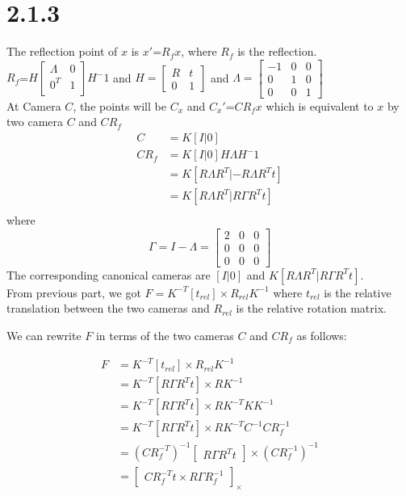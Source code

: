 \documentclass{article}
\begin{document}
\section*{2.1.3}
The reflection point of $x$ is $x'$=$R_fx$, where $R_f$ is the reflection.\\
$R_f$=$H\begin{bmatrix}
    \Lambda &0\\
    0^T &1\\
\end{bmatrix}H^-1$ and $H=\begin{bmatrix}
    R&t\\
    0&1
\end{bmatrix}$ and $\Lambda=\begin{bmatrix}
    -1&0&0\\
    0&1&0\\
    0&0&1
\end{bmatrix}$\\
At Camera $C$, the points will be $C_x$ and $C_x'$=$C R_f x$ which is equivalent to $x$ by two camera $C$ and $CR_f$\\
\begin{align*}
    C&=K[I|0]\\
    CR_f&=K[I|0]H\Lambda H^-1\\
    &=K[R\Lambda R^T|-R\Lambda R^Tt]\\
    &=K[R\Lambda R^T|R\Gamma R^Tt]\\
\end{align*}
where \begin{equation*}
    \Gamma=I-\Lambda=\begin{bmatrix}
        2&0&0\\
        0&0&0\\
        0&0&0
    \end{bmatrix}
\end{equation*}
The corresponding canonical cameras are $[I|0]$ and $K[R\Lambda R^T|R\Gamma R^Tt]$.\\
From previous part, we got 
    $F = K^{-T} [t_{rel}]\times R_{rel} K^{-1}$
    where $t_{rel}$ is the relative translation between the two cameras and $R_{rel}$ is the relative rotation matrix.

    We can rewrite $F$ in terms of the two cameras $C$ and $CR_f$ as follows:
    
    \begin{align*}
    F &= K^{-T} [t_{rel}]\times R_{rel} K^{-1}\\
    &= K^{-T} [R\Gamma R^Tt]\times R K^{-1}\\
    &= K^{-T} [R\Gamma R^Tt]\times R K^{-T} K K^{-1}\\
    &= K^{-T} [R\Gamma R^Tt]\times R K^{-T} C^{-1} CR_f^{-1}\\
    &= (CR_f^{-T})^{-1} \begin{bmatrix} R\Gamma R^Tt \end{bmatrix}\times (CR_f^{-1})^{-1}\\
    &= \begin{bmatrix} CR_f^{-T}t\times R\Gamma R_f^{-1} \end{bmatrix}_\times\\
    \end{align*}
    
\end{document}
